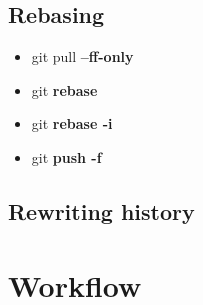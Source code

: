 \documentclass{beamer}
\begin{document}
\subsection{Rebasing}
\begin{frame}[fragile]
  \begin{block}{}
    \begin{itemize}
      \item git pull \textbf{--ff-only}
      \item git \textbf{rebase}
      \item git \textbf{rebase -i}
      \item git \textbf{push -f}
    \end{itemize}
  \end{block}
\end{frame}
\subsection{Rewriting history}
\begin{frame}[fragile]
\end{frame}
\section{Workflow}
\begin{frame}[fragile]
\end{frame}
\end{document}
